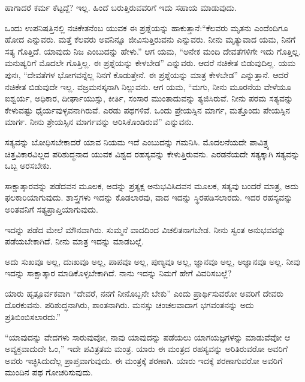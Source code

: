 ಹಾಗಾದರೆ ಕರ್ಮ ಕೆಟ್ಟದ್ದೆ? ಇಲ್ಲ. ಹಿಂದೆ ಬರುತ್ತಿರುವವರಿಗೆ ಇದು ಸಹಾಯ ಮಾಡುವುದು.

ಒಂದು ಉಪನಿಷತ್ತಿನಲ್ಲಿ ನಚಿಕೇತನೆಂಬ ಯುವಕ ಈ ಪ್ರಶ್ನೆಯನ್ನು ಹಾಕುತ್ತಾನೆ:\break “ಕೆಲವರು ಮೃತನು ಎಂದೆಂದಿಗೂ ಹೋದ ಎನ್ನುವರು. ಮತ್ತೆ ಕೆಲವರು ಅವನಿನ್ನೂ ಜೀವಿಸುತ್ತಿರುವನು ಎನ್ನುವರು. ನೀನು ಮೃತ್ಯುವಾದ ಯಮ, ನಿನಗೆ ಸತ್ಯ ಗೊತ್ತಿದೆ. ಯಾವುದು ನಿಜ ಎಂಬುದನ್ನು ಹೇಳು.” ಆಗ ಯಮ, “ಅನೇಕ ಮಂದಿ ದೇವತೆಗಳಿಗೇ ಇದು ಗೊತ್ತಿಲ್ಲ. ಮನುಷ್ಯರಿಗೆ ಮೊದಲೇ ಗೊತ್ತಿಲ್ಲ. ಈ ಪ್ರಶ್ನೆಯನ್ನು ಕೇಳಬೇಡ” ಎನ್ನುವರು. ಆದರೆ ನಚಿಕೇತ ಬಿಡುವುದಿಲ್ಲ. ಯಮ ಪುನಃ, “ದೇವತೆಗಳ ಭೋಗವನ್ನೆಲ್ಲ ನಿನಗೆ ಕೊಡುತ್ತೇನೆ. ಈ ಪ್ರಶ್ನೆಯನ್ನು ಮಾತ್ರ ಕೇಳಬೇಡ” ಎನ್ನುತ್ತಾನೆ. ಆದರೆ ನಚಿಕೇತ ಬಿಡುವುದೇ ಇಲ್ಲ. ವಜ್ರಮನಸ್ಕನಾಗಿ ನಿಲ್ಲುವನು. ಆಗ ಯಮ, “ಮಗು, ನೀನು ಮೂರನೆಯ ವೇಳೆಯೂ ಐಶ್ವರ್ಯ, ಅಧಿಕಾರ, ದೀರ್ಘಾಯುಸ್ಸು, ಕೀರ್ತಿ, ಸಂಸಾರ ಮುಂತಾದುವನ್ನು ತ್ಯಜಿಸಿರುವೆ. ನೀನು ಪರಮ ಸತ್ಯವನ್ನು ಕೇಳುವಷ್ಟು ಧೈರ್ಯವುಳ್ಳವನಾಗಿರುವೆ. ಎರಡು ಪಥಗಳಿವೆ. ಒಂದು ಪ್ರೇಯಸ್ಸಿನ ಮಾರ್ಗ, ಮತ್ತೊಂದು ಪೇಯಸ್ಸಿನ ಮಾರ್ಗ. ನೀನು ಶ್ರೇಯಸ್ಸಿನ ಮಾರ್ಗವನ್ನು ಆರಿಸಿಕೊಂಡಿರುವೆ” ಎನ್ನುವನು.

ಸತ್ಯವನ್ನು ಬೋಧಿಸಬೇಕಾದರೆ ಯಾವ ನಿಯಮ ಇದೆ ಎಂಬುದನ್ನು ಗಮನಿಸಿ. ಮೊದಲನೆಯದೇ ಪಾವಿತ್ರ್ಯ ಚಿತ್ತವಿಕಾರವಿಲ್ಲದ ಪರಿಶುದ್ಧನಾದ ಯುವಕ ವಿಶ್ವದ ರಹಸ್ಯವನ್ನು ಕೇಳುತ್ತಿರುವನು. ಎರಡನೆಯದೇ ಸತ್ಯಕ್ಕಾಗಿ ಸತ್ಯವನ್ನು ಒಬ್ಬ ಅರಸಬೇಕು.

ಸಾಕ್ಷಾತ್ಕಾರವನ್ನು ಪಡೆದವನ ಮೂಲಕ, ಅದನ್ನು ಪ್ರತ್ಯಕ್ಷ ಅನುಭವಿಸಿದವನ ಮೂಲಕ, ಸತ್ಯವು ಬಂದರೆ ಮಾತ್ರ, ಅದು ಫಲಕಾರಿಯಾಗುವುದು. ಶಾಸ್ತ್ರಗಳು ಇದನ್ನು ಕೊಡಲಾರವು, ವಾದ ಇದನ್ನು ಸ್ಥಿರಪಡಿಸಲಾರದು. ಇದರ ರಹಸ್ಯವನ್ನು ಅರಿತವನಿಗೆ ಸತ್ಯ\break ಪ್ರಾಪ್ತಿಯಾಗುವುದು.

ಇದನ್ನು ಪಡೆದ ಮೇಲೆ ಮೌನವಾಗಿರು. ಸುಮ್ಮನೆ ವಾದದಿಂದ ವಿಚಲಿತನಾಗಬೇಡ. ನೀನು ಸ್ವಂತ ಅನುಭವವನ್ನು ಪಡೆಯಬೇಕಾಗಿದೆ. ನೀನು ಮಾತ್ರ ಇದನ್ನು ಮಾಡಬಲ್ಲೆ.

\eject

ಅದು ಸುಖವೂ ಅಲ್ಲ, ದುಃಖವೂ ಅಲ್ಲ, ಪಾಪವೂ ಅಲ್ಲ, ಪುಣ್ಯವೂ ಅಲ್ಲ, ಜ್ಞಾನವೂ ಅಲ್ಲ, ಅಜ್ಞಾನವೂ ಅಲ್ಲ. ನೀವು ಇದನ್ನು ಸಾಕ್ಷಾತ್ಕಾರ ಮಾಡಿಕೊಳ್ಳಬೇಕಾಗಿದೆ. ನಾನು ಇದನ್ನು ನಿಮಗೆ ಹೇಗೆ ವಿವರಿಸಬಲ್ಲೆ?

ಯಾರು ಹೃತ್ಪೂರ್ವಕವಾಗಿ “ದೇವರೆ, ನನಗೆ ನೀನೊಬ್ಬನೇ ಬೇಕು” ಎಂದು ಪ್ರಾರ್ಥಿಸುವರೋ ಅವರಿಗೆ ದೇವರು ದೊರಕುವನು. ಪರಿಶುದ್ಧನಾಗಿರು, ಶಾಂತನಾಗಿರು. ಮನಸ್ಸು ಚಂಚಲವಾದಾಗ ಭಗವಂತನನ್ನು ಅದು ಪ್ರತಿಬಿಂಬಿಸಲಾರದು.”

“ಯಾವುದನ್ನು ವೇದಗಳು ಸಾರುವುವೋ, ನಾವು ಯಾವುದನ್ನು ಪಡೆಯಲು ಯಾಗಯಜ್ಞಗಳನ್ನು ಮಾಡುವೆವೋ ಆ ಅವ್ಯಕ್ತವಾದುದೇ ಓಂ,” ಇದೇ ಪವಿತ್ರತಮ ಮಂತ್ರ. ಯಾರು ಈ ಮಂತ್ರದ ರಹಸ್ಯವನ್ನು ಅರಿತಿರುವರೋ ಅವರಿಗೆ ಅವರು ಇಚ್ಛಿಸಿದುದೆಲ್ಲ ಪ್ರಾಪ್ತವಾಗುವುದು. ಈ ಮಂತ್ರಕ್ಕೆ ಶರಣಾಗಿ. ಯಾರು ಇದಕ್ಕೆ ಶರಣಾಗುವರೋ ಅವರಿಗೆ ಮುಂದಿನ ಪಥ ಗೋಚರಿಸುವುದು.


